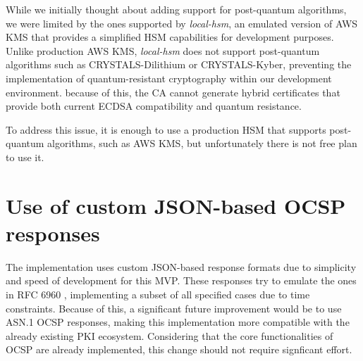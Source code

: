 While we initially thought about adding support for post-quantum algorithms, we were limited by the ones 
supported by \textit{local-hsm}, an emulated version of AWS KMS that provides a 
simplified HSM capabilities for development purposes. Unlike production AWS KMS, \textit{local-hsm} does 
not support post-quantum algorithms such as CRYSTALS-Dilithium or CRYSTALS-Kyber, preventing the 
implementation of quantum-resistant cryptography within our development environment. because of this,
the CA cannot generate hybrid certificates that provide both current ECDSA compatibility 
and quantum resistance.

To address this issue, it is enough to use a production HSM that supports post-quantum algorithms, such as AWS KMS,
but unfortunately there is not free plan to use it.

\section{Use of custom JSON-based OCSP responses}

The implementation uses custom JSON-based response formats due to simplicity and speed of development 
for this MVP. These responses try to emulate the ones in RFC 6960 \cite{rfc6960}, implementing a subset of all
specified cases due to time constraints.
Because of this, a significant future improvement would be to use ASN.1 OCSP responses, making this 
implementation more compatible with the already existing PKI ecosystem. Considering that the core 
functionalities of OCSP are already implemented, this change should not require signficant effort.
